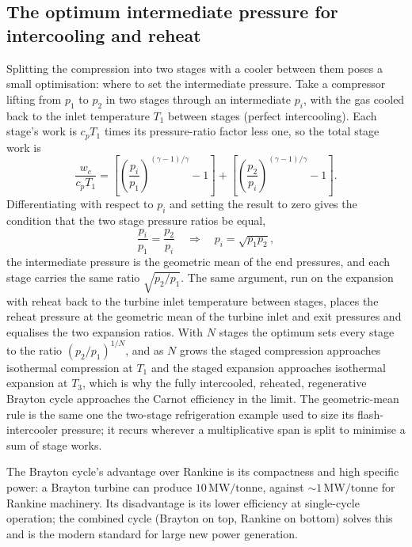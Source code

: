 

\subsection{The optimum intermediate pressure for intercooling and reheat}

Splitting the compression into two stages with a cooler between them poses a
small optimisation: where to set the intermediate pressure. Take a compressor
lifting from $p_1$ to $p_2$ in two stages through an intermediate $p_i$, with
the gas cooled back to the inlet temperature $T_1$ between stages (perfect
intercooling). Each stage's work is $c_p T_1$ times its pressure-ratio
factor less one, so the total stage work is
\[
\frac{w_c}{c_p T_1} = \left[\left(\frac{p_i}{p_1}\right)^{(\gamma-1)/\gamma}
- 1\right] + \left[\left(\frac{p_2}{p_i}\right)^{(\gamma-1)/\gamma} - 1\right].
\]
Differentiating with respect to $p_i$ and setting the result to zero gives
the condition that the two stage pressure ratios be equal,
\[
\frac{p_i}{p_1} = \frac{p_2}{p_i}
\quad\Longrightarrow\quad
p_i = \sqrt{p_1 p_2},
\]
the intermediate pressure is the geometric mean of the end pressures, and
each stage carries the same ratio $\sqrt{p_2/p_1}$. The same argument, run on
the expansion with reheat back to the turbine inlet temperature between
stages, places the reheat pressure at the geometric mean of the turbine
inlet and exit pressures and equalises the two expansion ratios. With $N$
stages the optimum sets every stage to the ratio $(p_2/p_1)^{1/N}$, and as
$N$ grows the staged compression approaches isothermal compression at $T_1$
and the staged expansion approaches isothermal expansion at $T_3$, which is
why the fully intercooled, reheated, regenerative Brayton cycle approaches
the Carnot efficiency in the limit. The geometric-mean rule is the same one
the two-stage refrigeration example used to size its flash-intercooler
pressure; it recurs wherever a multiplicative span is split to minimise a sum
of stage works.

The Brayton cycle's advantage over Rankine is its compactness and
high specific power: a Brayton turbine can produce $10\,\text{MW}/
\text{tonne}$, against $\sim 1\,\text{MW}/\text{tonne}$ for Rankine
machinery. Its disadvantage is its lower efficiency at single-cycle
operation; the combined cycle (Brayton on top, Rankine on bottom)
solves this and is the modern standard for large new power
generation.

